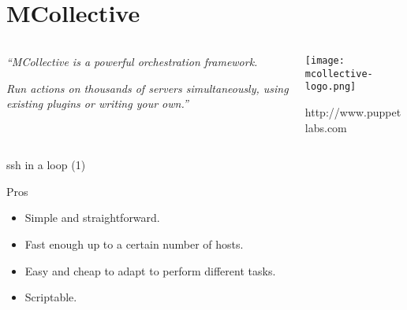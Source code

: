 \documentclass[presentation,c]{beamer}
\begin{document}
\section{MCollective}
\label{sec-15}
{
\begin{frame}[label=sec-15-1]{}

\begin{columns}
\begin{column}{0.6\textwidth}

\textit{``MCollective is a powerful orchestration framework.}

\textit{Run actions on thousands of servers simultaneously, using existing plugins or writing your own.''}
\end{column}

\begin{column}{0.4\textwidth}

\texttt{[image: mcollective-logo.png]}

\small{http://www.puppetlabs.com}
\end{column}
\end{columns}
\end{frame}
} %


{
\begin{frame}[label=sec-15-2]{ssh in a loop (1)}

\begin{block}{Pros}

\begin{itemize}
\item Simple and straightforward.
\item Fast enough up to a certain number of hosts.
\item Easy and cheap to adapt to perform different tasks.
\item Scriptable.
\end{itemize}
\end{block}
\end{frame}
} %
\end{document}

